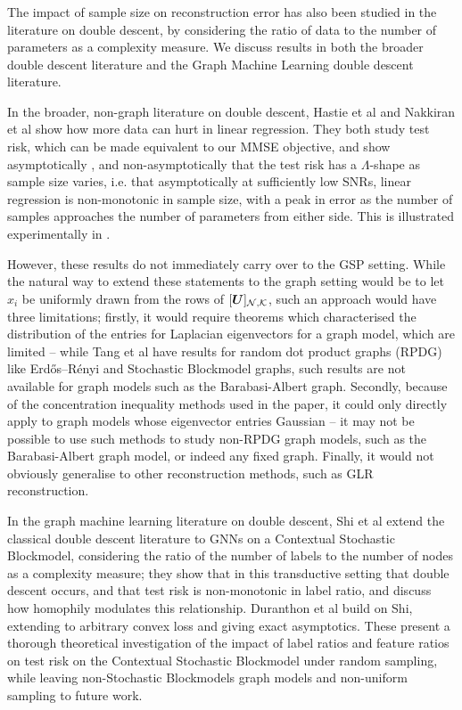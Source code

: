 \subsubsection{}
{\color{blue}The impact of sample size on reconstruction error has also been studied in the literature on double descent, by considering the ratio of data to the number of parameters as a complexity measure. We discuss results in both the broader double descent literature and the Graph Machine Learning double descent literature.

In the broader, non-graph literature on double descent, Hastie et al \cite{hastie2022surprises} and Nakkiran et al \cite{nakkiran2019more} show how more data can hurt in linear regression. They both study test risk, which can be made equivalent to our MMSE objective, and show asymptotically \cite[Theorem 1]{hastie2022surprises}, \cite[Claim 1]{nakkiran2019more} and non-asymptotically \cite[Theorem 2]{hastie2022surprises} that the test risk has a $\Lambda$-shape as sample size varies, i.e. that asymptotically at sufficiently low SNRs, linear regression is non-monotonic in sample size, with a peak in error as the number of samples approaches the number of parameters from either side. This is illustrated experimentally in \cite[Fig. 1]{nakkiran2019more}.

However, these results do not immediately carry over to the GSP setting. While the natural way to extend these statements to the graph setting would be to let $x_{i}$ be uniformly drawn from the rows of $\matrsubU{N}$, such an approach would have three limitations; firstly, it would require theorems which characterised the distribution of the entries for Laplacian eigenvectors for a graph model, which are limited -- while Tang et al \cite{tang2018limit} have results for random dot product graphs (RPDG) like Erdős–Rényi and Stochastic Blockmodel graphs, such results are not available for graph models such as the Barabasi-Albert graph. Secondly, because of the concentration inequality methods used in the paper, it could only directly apply to graph models whose eigenvector entries Gaussian -- it may not be possible to use such methods to study non-RPDG graph models, such as the Barabasi-Albert graph model, or indeed any fixed graph. Finally, it would not obviously generalise to other reconstruction methods, such as GLR reconstruction.

In the graph machine learning literature on double descent, 
Shi et al \cite{shi2024homophily} extend the classical double descent literature to GNNs on a Contextual Stochastic Blockmodel, considering the ratio of the number of labels to the number of nodes as a complexity measure; they show that in this transductive setting that double descent occurs, and that test risk is non-monotonic in label ratio, and discuss how homophily modulates this relationship. Duranthon et al \cite{duranthon2024asymptotic} build on Shi, extending to arbitrary convex loss and giving exact asymptotics. These present a thorough theoretical investigation of the impact of label ratios and feature ratios on test risk on the Contextual Stochastic Blockmodel under random sampling, while leaving non-Stochastic Blockmodels graph models and non-uniform sampling to future work.

}
